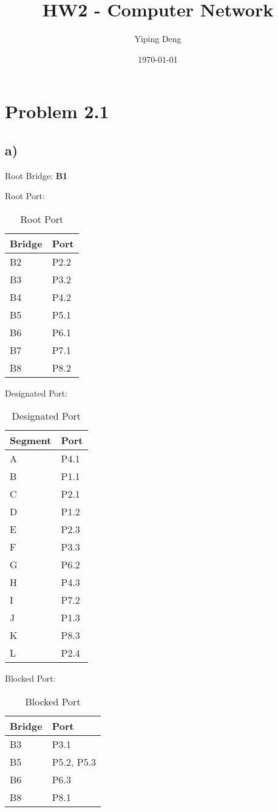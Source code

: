 \documentclass[11pt]{article}
\author{Yiping Deng}
\date{\today}
\title{HW2 - Computer Network}
\begin{document}
\maketitle
\tableofcontents


\section{Problem 2.1}
\label{sec:org03104e4}
\subsection{a)}
\label{sec:orgafe573d}
Root Bridge: \textbf{B1}

Root Port:
\begin{table}[htbp]
\caption{Root Port}
\centering
\begin{tabular}{ll}
Bridge & Port\\
\hline
B2 & P2.2\\
B3 & P3.2\\
B4 & P4.2\\
B5 & P5.1\\
B6 & P6.1\\
B7 & P7.1\\
B8 & P8.2\\
\end{tabular}
\end{table}


Designated Port:
\begin{table}[htbp]
\caption{Designated Port}
\centering
\begin{tabular}{ll}
Segment & Port\\
\hline
A & P4.1\\
B & P1.1\\
C & P2.1\\
D & P1.2\\
E & P2.3\\
F & P3.3\\
G & P6.2\\
H & P4.3\\
I & P7.2\\
J & P1.3\\
K & P8.3\\
L & P2.4\\
\end{tabular}
\end{table}


Blocked Port:
\begin{table}[htbp]
\caption{Blocked Port}
\centering
\begin{tabular}{ll}
Bridge & Port\\
\hline
B3 & P3.1\\
B5 & P5.2, P5.3\\
B6 & P6.3\\
B8 & P8.1\\
\end{tabular}
\end{table}
\end{document}
